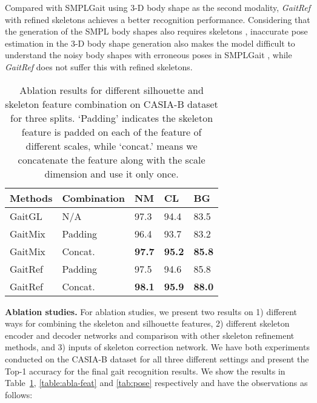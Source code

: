 \documentclass[10pt,twocolumn,letterpaper]{article}
\begin{document}
Compared with SMPLGait using 3-D body shape as the second modality, \textit{GaitRef} with refined skeletons achieves a better recognition performance. Considering that the generation of the SMPL body shapes also requires skeletons \cite{sun2022putting}, inaccurate pose estimation in the 3-D body shape generation also makes the model difficult to understand the noisy body shapes with erroneous poses in SMPLGait \cite{zheng2022gait}, while \textit{GaitRef} does not suffer this with refined skeletons.


\begin{table}
\begin{center}
\resizebox{0.8\columnwidth}{!}
{
\begin{tabular}{p{1.4cm}p{2.4cm}<{\centering}p{.8cm}<{\centering}p{.8cm}<{\centering}p{.8cm}<{\centering}}
\toprule
Methods & Combination & NM & CL & BG \\
\midrule
GaitGL & N/A & 97.3 & 94.4 & 83.5 \\
\midrule
GaitMix & Padding & 96.4 & 93.7 & 83.2 \\
GaitMix & Concat. & \textbf{97.7} & \textbf{95.2} & \textbf{85.8} \\
\midrule
GaitRef & Padding & 97.5 & 94.6 & 85.8 \\
GaitRef & Concat. & \textbf{98.1} & \textbf{95.9} & \textbf{88.0} \\
\bottomrule
\end{tabular}}
\end{center}
\caption{Ablation results for different silhouette and skeleton feature combination on CASIA-B dataset for three splits. `Padding' indicates the skeleton feature is padded on each of the feature of different scales, while `concat.' means we concatenate the feature along with the scale dimension and use it only once.}
\label{table:abla-comb}
\end{table}
 
\textbf{Ablation studies. }For ablation studies, we present two results on 1) different ways for combining the skeleton and silhouette features, 2) different skeleton encoder and decoder networks and comparison with other skeleton refinement methods, and 3) inputs of skeleton correction network. We have both experiments conducted on the CASIA-B dataset \cite{yu2006framework} for all three different settings and present the Top-1 accuracy for the final gait recognition results. We show the results in Table~\ref{table:abla-comb}, \ref{table:abla-feat} and \ref{tab:pose} respectively and have the observations as follows:
\end{document}
